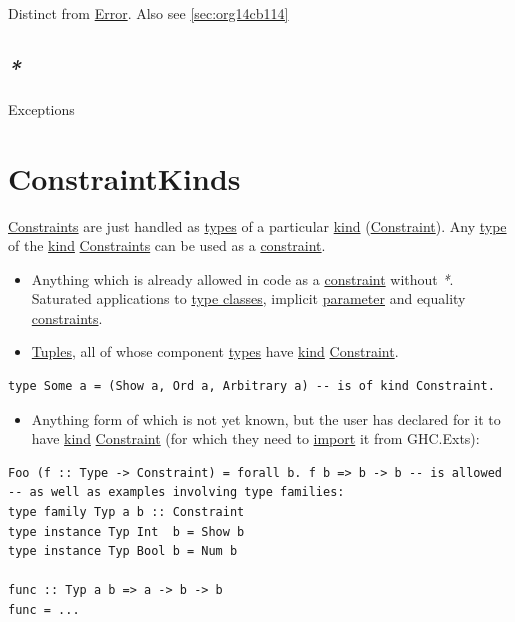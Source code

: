 \documentclass[a4paper,14pt,oneside]{book}
\begin{document}
Distinct from \hyperref[org56de0c9]{Error}. Also see \ref{sec:org14cb114}

\section{\emph{*}}
\label{sec:orgd9c169d}

\label{orgf865323}Exceptions

\chapter{\label{org8afea8d}ConstraintKinds}
\label{sec:org7cb04e4}
\hyperref[orgbe0ae3a]{Constraints} are just handled as \hyperref[org05a3981]{types} of a particular \hyperref[orgce1298f]{kind} (\hyperref[org24debe5]{Constraint}).
Any \hyperref[org02a9d3a]{type} of the \hyperref[orgce1298f]{kind} \hyperref[orgbe0ae3a]{Constraints} can be used as a \hyperref[org24debe5]{constraint}.
\begin{itemize}
\item Anything which is already allowed in code as a \hyperref[org24debe5]{constraint} without \emph{*}. Saturated applications to \hyperref[org3323786]{type classes}, implicit \hyperref[orgd1897e3]{parameter} and equality \hyperref[orgbe0ae3a]{constraints}.
\item \hyperref[org298c373]{Tuples}, all of whose component \hyperref[org05a3981]{types} have \hyperref[orgce1298f]{kind} \hyperref[org24debe5]{Constraint}.
\end{itemize}
\begin{verbatim}
type Some a = (Show a, Ord a, Arbitrary a) -- is of kind Constraint.
\end{verbatim}
\begin{itemize}
\item Anything form of which is not yet known, but the user has declared for it to have \hyperref[orgce1298f]{kind} \hyperref[org24debe5]{Constraint} (for which they need to \hyperref[org5839f78]{import} it from GHC.Exts):
\end{itemize}
\begin{verbatim}
Foo (f :: Type -> Constraint) = forall b. f b => b -> b -- is allowed
-- as well as examples involving type families:
type family Typ a b :: Constraint
type instance Typ Int  b = Show b
type instance Typ Bool b = Num b

func :: Typ a b => a -> b -> b
func = ...
\end{verbatim}
\end{document}
